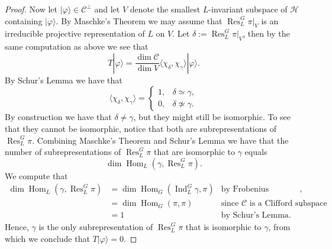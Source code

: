 \documentclass[10pt,a4paper]{amsart}
\newcommand{\Hom}{\operatorname{Hom}}
\newcommand{\Ind}{\operatorname{Ind}}
\newcommand{\Res}{\operatorname{Res}}
\newcommand{\calC}{\mathcal{C}}
\newcommand{\calH}{\mathcal{H}}
\def\ket#1{| #1 \rangle}
\begin{document}
\begin{proof}
    Now let $\ket{\varphi} \in \calC^\perp$ and let $V$ denote the smallest $L$-invariant subspace of $\calH$ containing $\ket{\varphi}$. By Maschke's Theorem we may assume that $\Res^G_L\pi|_V$ is an irreducible projective representation of $L$ on $V$. Let $\delta := \Res^G_L\pi|_V$, then by the same computation as above we see that
    \begin{equation*}
        T \ket{\varphi} = \frac{\dim\calC}{\dim V}\langle\chi_\delta, \chi_\gamma\rangle\ket{\varphi}.
    \end{equation*}
    By Schur's Lemma we have that
    \begin{equation*}
        \langle\chi_\delta, \chi_\gamma\rangle =
        \begin{cases}
            1, & \delta \simeq \gamma, \\
            0, & \delta \not\simeq \gamma.
        \end{cases}
    \end{equation*}
    By construction we have that $\delta \neq \gamma$, but they might still be isomorphic. To see that they cannot be isomorphic, notice that both are subrepresentations of $\Res^G_L\pi$. Combining Maschke's Theorem and Schur's Lemma we have that the number of subrepresentations of $\Res^G_L\pi$ that are isomorphic to $\gamma$ equals
    \begin{equation*}
        \dim \Hom_L(\gamma, \Res^G_L\pi).
    \end{equation*}
    We compute that
    \begin{align*}
        \dim \Hom_L(\gamma, \Res^G_L\pi)
        & = \dim \Hom_G(\Ind_L^G\gamma, \pi) & \text{by Frobenius reciprocity}, \\
        & = \dim \Hom_G(\pi, \pi) & \text{since $\calC$ is a Clifford subspace code}, \\
        & = 1 & \text{by Schur's Lemma}.
    \end{align*}
    Hence, $\gamma$ is the only subrepresentation of $\Res^G_L\pi$ that is isomorphic to $\gamma$, from which we conclude that $T\ket{\varphi} = 0$.
\end{proof}
\end{document}
